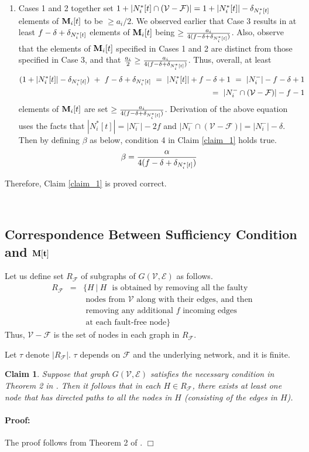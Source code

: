 \documentclass[letterpaper, 12pt]{article}
\newenvironment{proof}{\paragraph{\bf Proof:}}{\hspace*{\fill}\(\Box\)}
\newcommand{\scriptf}{\mathcal{F}}
\newcommand{\scripte}{\mathcal{E}}
\newcommand{\scriptv}{\mathcal{V}}
\newtheorem{claim}{Claim}
\begin{document}
\begin{enumerate}
\item
Cases 1 and 2 together set $1+|N_i^*[t]\cap(\scriptv-\scriptf)|=
1+|N_i^*[t]|-\deltaC$
elements of ${\bf M}_i[t]$ to be $\geq a_i/2$. We observed
earlier that Case 3 results in at least
$f-\delta+\delta_{N_i^*[t]}$ elements of ${\bf M}_i[t]$ 
being $\geq \frac{a_i}{4(f-\delta+\delta_{N_i^*[t]})}$.
Also, observe that the elements of ${\bf M}_i[t]$ specified
in Cases 1 and 2 are distinct from those specified in Case 3,
and that $\frac{a_i}{2} \geq \frac{a_i}{4(f-\delta+\delta_{N_i^*[t]})}$. Thus, overall, at
least
\begin{eqnarray*}
(1+|N_i^*[t]|-\deltaC) ~+~
f-\delta+\deltaC ~=~ |N_i^*[t]|+f-\delta+1
~=~ |N_i^-|-f-\delta+1 && \\ ~=~ |N_i^-\cap(\scriptv-\scriptf)|-f-1
&& \end{eqnarray*}
elements of ${\bf M}_i[t]$ are set
$\geq \frac{a_i}{4(f-\delta+\delta_{N_i^*[t]})}$.
Derivation of the above equation uses the facts that
$|N_i^*[t]|=|N_i^-|-2f$ and
$|N_i^-\cap(\scriptv-\scriptf)|=|N_i^-|-\delta$. Then
by defining $\beta$ as below, condition 4 in Claim \ref{claim_1}
holds true.
\[
\beta = \frac{\alpha}{4(f-\delta+\delta_{N_i^*[t]})}
\]
\end{enumerate}

Therefore, Claim \ref{claim_1} is proved correct.

~


\subsection{Correspondence Between Sufficiency Condition and $\bf M[t]$}

Let us define set $R_\scriptf$ of subgraphs of $G(\scriptv,\scripte)$ as follows.
\begin{eqnarray}
R_\scriptf & = & \{ H ~ | ~ H \mbox{~ is obtained by removing all the faulty}
\nonumber \\
&& \mbox{ nodes
	 from $\scriptv$ along with their edges, and then} \nonumber
	\\ && \mbox{ removing any additional $f$ incoming edges}\nonumber \\ 
&&
	\mbox{ at each fault-free node} \}
\end{eqnarray}
Thus, $\scriptv-\scriptf$ is the set of nodes in each graph in $R_\scriptf$.

Let $\tau$ denote $|R_\scriptf|$. 
$\tau$ depends on $\scriptf$ and the underlying network, and it is finite.


\begin{claim}
\label{claim_suff}
Suppose that graph $G(\scriptv,\scripte)$ satisfies the necessary condition in 
Theorem 2 in \cite{us}. Then it follows that in each $H\in R_\scriptf$,
there exists at least one node that has directed paths to all the nodes in $H$
(consisting of the edges in $H$).
\end{claim}
\begin{proof}
The proof follows from Theorem 2 of \cite{us}.
\end{proof}
\end{document}
